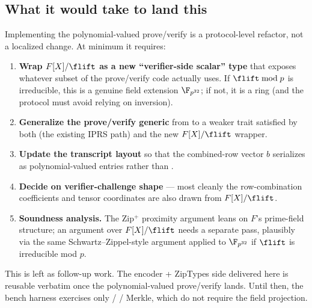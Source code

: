 \subsection{What it would take to land this}

Implementing the polynomial-valued prove/verify is a
protocol-level refactor, not a localized change. At minimum it
requires:

\begin{enumerate}
  \item \textbf{Wrap $F[X]/\flift$ as a new ``verifier-side scalar''
    type} that exposes whatever subset of  the
    prove/verify code actually uses. If $\flift \bmod p$ is
    irreducible, this is a genuine field extension $\F_{p^{32}}$;
    if not, it is a ring (and the protocol must avoid relying on
    inversion).
  \item \textbf{Generalize the prove/verify generic} from
     to a weaker trait satisfied by both
     (the existing IPRS path) and the new
    $F[X]/\flift$ wrapper.
  \item \textbf{Update the transcript layout} so that the
    combined-row vector $b$ serializes as polynomial-valued entries
    rather than .
  \item \textbf{Decide on verifier-challenge shape} ---
    most cleanly the row-combination coefficients and tensor
    coordinates are also drawn from $F[X]/\flift$.
  \item \textbf{Soundness analysis.} The Zip$^+$ proximity
    argument leans on $F$'s prime-field structure; an argument
    over $F[X]/\flift$ needs a separate pass, plausibly via
    the same Schwartz--Zippel-style argument applied to
    $\F_{p^{32}}$ if $\flift$ is irreducible mod $p$.
\end{enumerate}

This is left as follow-up work. The encoder + ZipTypes side
delivered here is reusable verbatim once the polynomial-valued
prove/verify lands. Until then, the bench harness exercises only
 /  / Merkle, which do not require
the field projection.
